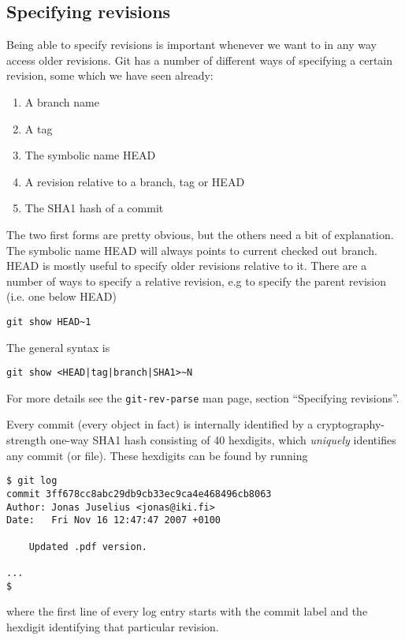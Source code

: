 \documentclass[a4paper,10pt]{article}
\begin{document}
\subsection{Specifying revisions}
\label{sec:revision}
Being able to specify revisions is important whenever we want to in any way 
access older revisions. Git has a number of different ways of specifying a
certain revision, some which we have seen already:
\begin{enumerate}
  \item A branch name
  \item A tag
  \item The symbolic name HEAD
  \item A revision relative to a branch, tag or HEAD
  \item The SHA1 hash of a commit	
\end{enumerate}
The two first forms are pretty obvious, but the others need a bit of
explanation. The symbolic name HEAD will always points to current
checked out branch.  HEAD is mostly useful to specify
older revisions relative to it. There are a number of ways to specify
a relative revision, e.g to specify the parent revision (i.e. one below HEAD)
\begin{verbatim}
git show HEAD~1
\end{verbatim}
The general syntax is
\begin{verbatim}
git show <HEAD|tag|branch|SHA1>~N
\end{verbatim}
For more details see the \texttt{git-rev-parse} man page,
section ``Specifying revisions''.

Every commit (every object in fact) is internally identified by a
cryptography-strength one-way SHA1 hash consisting of 40 hexdigits, which
\emph{uniquely} identifies any commit (or file). These hexdigits can be found
by running 
\begin{verbatim}
$ git log
commit 3ff678cc8abc29db9cb33ec9ca4e468496cb8063
Author: Jonas Juselius <jonas@iki.fi>
Date:   Fri Nov 16 12:47:47 2007 +0100

    Updated .pdf version.

...
$
\end{verbatim}
where the first line of every log entry starts with the commit label and the
hexdigit identifying that particular revision.
\end{document}
